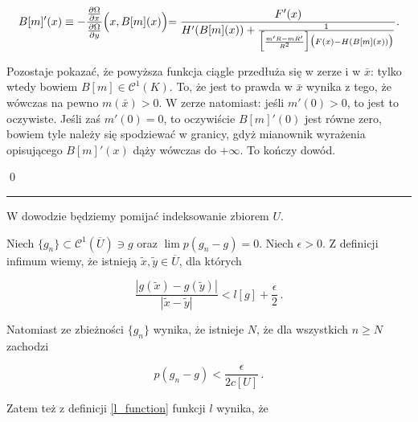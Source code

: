 \begin{equation*}
	B[m]'(x) \equiv	-\frac{\frac{\partial \Omega}{\partial x}}{\frac{\partial \Omega}{\partial y}} \Bigl( x, B[m](x)\Bigl) = \frac{F'(x)}{H'(B[m](x)) + \frac{1}{\Bigl [ \frac{m'R - m R'}{R^2}	\Bigl ] \bigl (F(x)-H(B[m](x)) \bigl )}}.
\end{equation*}

Pozostaje pokazać, że powyższa funkcja ciągle przedłuża się w zerze i w $\bar{x}$: tylko wtedy bowiem $B[m] \in \mathcal{C}^{1}(K)$. To, że jest to prawda w $\bar{x}$ wynika z tego, że wówczas na pewno $m(\bar{x})>0$. W zerze natomiast: jeśli $m'(0) > 0$, to jest to oczywiste. Jeśli zaś $m'(0)=0$, to oczywiście $B[m]'(0)$ jest równe zero, bowiem tyle należy się spodziewać w granicy, gdyż mianownik wyrażenia opisującego $B[m]'(x)$ dąży wówczas do $+\infty$. To kończy dowód.	
	
\qed
\newline


\hrule
\begin{dowod}[Niech $ U \in \mathcal{T}(\mathbb{R}^n) $ to zbiór ograniczony i spójny, taki że 
$ c\brackets{U} \equiv \sup \Bigl\{  \frac{\lambda(x,y)}{|x-y|} : x,y \in U, x \not= y \Bigl\} < \infty$, gdzie $ \lambda(x,y) = \inf\Bigl\{ \int_{\gamma_{x,y}}1 : \gamma_{x,y} - \mathrm{krzywa\,klasy\,}\mathcal{C}^1, \, \gamma_{x,y}(0)=x \,, \gamma_{x,y}(1)=y \Bigl\} $. 
Wówczas $ g \mapsto l_U \brackets{g} $ jest ciągła z przestrzeni $ \mathcal{C}^1 (\overline{U}) $ wyposażoną w półnormę $ p(g) = \underset{1 \leq k \leq n}{\sum} || \pardiff{g}{x_k} ||_{\infty}$ w liczby rzeczywiste.]\label{proof_continuous in c1}
\end{dowod}

W dowodzie będziemy pomijać indeksowanie zbiorem $ U $.

	Niech $ \{ g_n \} \subset \mathcal{C}^1(\overline{U}) \ni g$ oraz $ \lim p(g_n - g) = 0 $. Niech $ \epsilon > 0 $. Z definicji infimum wiemy, że istnieją $ \tilde{x}, \tilde{y} \in \overline{U} $, dla których 
	
	$$ \frac{|g(\tilde{x})-g(\tilde{y})|}{|\tilde{x}-\tilde{y}|} < l[g] + \frac{\epsilon}{2} \,.$$	

Natomiast ze zbieżności $ \{ g_n \} $ wynika, że istnieje $ N $, że dla wszystkich $ n \geq N $ zachodzi

$$ p(g_n - g) < \frac{\epsilon}{2 c[U]} \,.$$

Zatem też z definicji \ref{l_function} funkcji $ l $ wynika, że 

